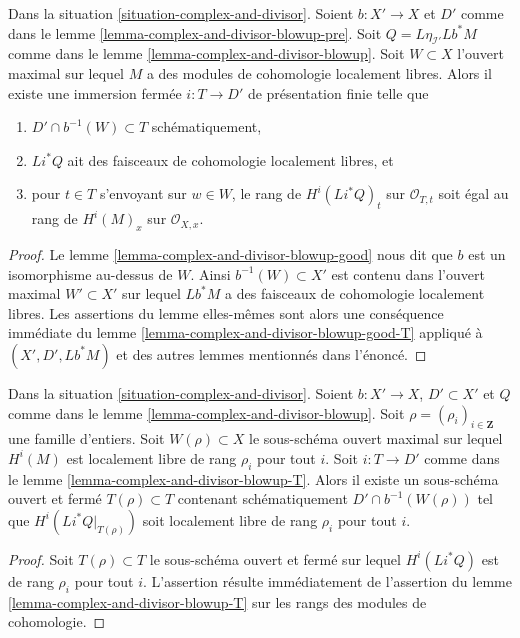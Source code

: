 \begin{lemma}
\label{lemma-complex-and-divisor-blowup-T}
Dans la situation \ref{situation-complex-and-divisor}. Soient $b : X' \to X$
et $D'$ comme dans le lemme \ref{lemma-complex-and-divisor-blowup-pre}. Soit
$Q = L\eta_{\mathcal{I}'}Lb^*M$ comme dans le
lemme \ref{lemma-complex-and-divisor-blowup}.
Soit $W \subset X$ l'ouvert maximal sur lequel $M$ a des
modules de cohomologie localement libres.
Alors il existe une immersion fermée $i : T \to D'$ de présentation finie
telle que
\begin{enumerate}
\item $D' \cap b^{-1}(W) \subset T$ schématiquement,
\item $Li^*Q$ ait des faisceaux de cohomologie localement libres, et
\item pour $t \in T$ s'envoyant sur $w \in W$, le rang
de $H^i(Li^*Q)_t$ sur $\mathcal{O}_{T, t}$ soit égal au
rang de $H^i(M)_x$ sur $\mathcal{O}_{X, x}$.
\end{enumerate}
\end{lemma}

\begin{proof}
Le lemme \ref{lemma-complex-and-divisor-blowup-good} nous dit que
$b$ est un isomorphisme au-dessus de $W$. Ainsi $b^{-1}(W) \subset X'$
est contenu dans l'ouvert maximal $W' \subset X'$ sur lequel $Lb^*M$
a des faisceaux de cohomologie localement libres. Les assertions du lemme elles-mêmes
sont alors une conséquence immédiate du
lemme \ref{lemma-complex-and-divisor-blowup-good-T} appliqué
à $(X', D', Lb^*M)$ et des autres lemmes mentionnés dans l'énoncé.
\end{proof}

\begin{lemma}
\label{lemma-complex-and-divisor-blowup-T-ranks}
Dans la situation \ref{situation-complex-and-divisor}. Soient $b : X' \to X$,
$D' \subset X'$ et $Q$ comme dans le
lemme \ref{lemma-complex-and-divisor-blowup}.
Soit $\rho = (\rho_i)_{i \in \mathbf{Z}}$ une famille d'entiers.
Soit $W(\rho) \subset X$ le sous-schéma ouvert maximal sur lequel
$H^i(M)$ est localement libre de rang $\rho_i$ pour tout $i$.
Soit $i : T \to D'$ comme dans le lemme \ref{lemma-complex-and-divisor-blowup-T}.
Alors il existe un sous-schéma ouvert et fermé $T(\rho) \subset T$
contenant schématiquement $D' \cap b^{-1}(W(\rho))$
tel que $H^i(Li^*Q|_{T(\rho)})$ soit localement libre de rang $\rho_i$
pour tout $i$.
\end{lemma}

\begin{proof}
Soit $T(\rho) \subset T$ le sous-schéma ouvert et fermé
sur lequel $H^i(Li^*Q)$ est de rang $\rho_i$ pour tout $i$. L'assertion
résulte immédiatement de l'assertion du
lemme \ref{lemma-complex-and-divisor-blowup-T}
sur les rangs des modules de cohomologie.
\end{proof}

